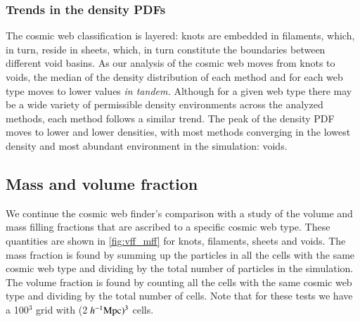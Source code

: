 \subsubsection{Trends in the density PDFs}
The cosmic web classification is layered: knots are embedded in filaments, which, in turn, reside in sheets, which, in turn constitute the boundaries between different void basins. As our analysis of the cosmic web moves from knots to voids, the median of the density distribution of each method and for each web type moves to lower values {\it in tandem.} Although for a given web type there may be a wide variety of permissible density environments across the analyzed methods, each method follows a similar trend. The peak of the density PDF moves to lower and lower densities, with most methods converging in the lowest density and most abundant environment in the simulation: voids.

\subsection{Mass and volume fraction}
We continue the cosmic web finder's comparison with a study of the volume and mass filling fractions that are ascribed to a specific cosmic web type. These quantities are shown in \autoref{fig:vff_mff} for knots, filaments, sheets and voids. The mass fraction is found by summing up the particles in all the cells with the same cosmic web type and dividing by the total number of particles in the simulation. The volume fraction is found by counting all the cells with the same cosmic web type and dividing by the total number of cells. Note that for these tests we have a 100$^3$ grid with (2$~h^{-1}\rm Mpc)^3$ cells.
 

